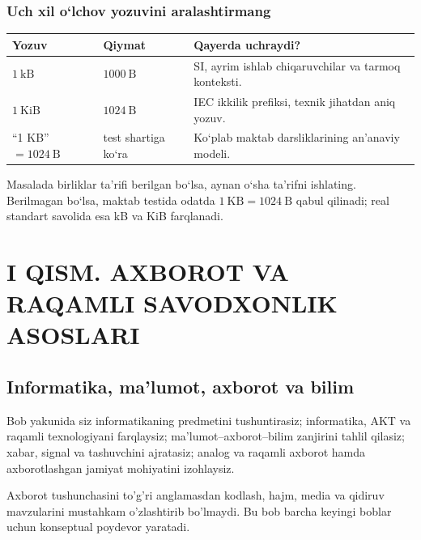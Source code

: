 \documentclass[11pt,a4paper,oneside]{book}
\newcommand{\B}{\mathrm{B}}
\newcommand{\chapterintro}[1]{\begin{tcolorbox}[colback=Navy,coltext=white,arc=2mm,boxrule=0pt]\sffamily #1\end{tcolorbox}}
\begin{document}
\section*{Uch xil o‘lchov yozuvini aralashtirmang}

\begin{tabularx}{\textwidth}{@{}L{34mm}L{35mm}Y@{}}
\toprule
\textbf{Yozuv} & \textbf{Qiymat} & \textbf{Qayerda uchraydi?}\\
\midrule
\(1~\mathrm{kB}\) & \(1000~\B\) & SI, ayrim ishlab chiqaruvchilar va tarmoq konteksti.\\
\(1~\mathrm{KiB}\) & \(1024~\B\) & IEC ikkilik prefiksi, texnik jihatdan aniq yozuv.\\
``1 KB'' \(=1024~\B\) & test shartiga ko‘ra &
Ko‘plab maktab darsliklarining an’anaviy modeli.\\
\bottomrule
\end{tabularx}

\begin{exam}
Masalada birliklar ta’rifi berilgan bo‘lsa, aynan o‘sha ta’rifni ishlating.
Berilmagan bo‘lsa, maktab testida odatda \(1~\mathrm{KB}=1024~\B\)
qabul qilinadi; real standart savolida esa kB va KiB farqlanadi.
\end{exam}


\mainmatter
\part{I QISM. AXBOROT VA RAQAMLI SAVODXONLIK ASOSLARI}
\chapter{Informatika, ma'lumot, axborot va bilim}

\begin{learningbox}
Bob yakunida siz informatikaning predmetini tushuntirasiz; informatika, AKT va raqamli texnologiyani farqlaysiz; ma'lumot--axborot--bilim zanjirini tahlil qilasiz; xabar, signal va tashuvchini ajratasiz; analog va raqamli axborot hamda axborotlashgan jamiyat mohiyatini izohlaysiz.
\end{learningbox}
\chapterintro{Axborot tushunchasini to'g'ri anglamasdan kodlash, hajm, media va qidiruv mavzularini mustahkam o'zlashtirib bo'lmaydi. Bu bob barcha keyingi boblar uchun konseptual poydevor yaratadi.}
\end{document}
